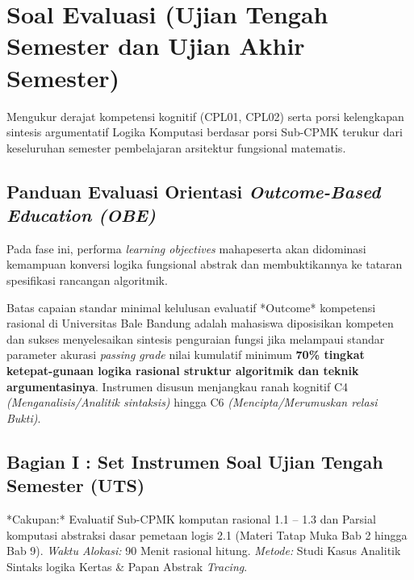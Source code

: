 \documentclass[../main.tex]{subfiles}
\begin{document}
\chapter{Soal Evaluasi (Ujian Tengah Semester dan Ujian Akhir Semester)}

\begin{subcpmk}
  \item Mengukur derajat kompetensi kognitif (CPL01, CPL02) serta porsi kelengkapan sintesis argumentatif Logika Komputasi berdasar porsi Sub-CPMK terukur dari keseluruhan semester pembelajaran arsitektur fungsional matematis.
\end{subcpmk}

\section{Panduan Evaluasi Orientasi \textit{Outcome-Based Education (OBE)} }
Pada fase ini, performa \textit{learning objectives} mahapeserta akan didominasi kemampuan konversi logika fungsional abstrak dan membuktikannya ke tataran spesifikasi rancangan algoritmik.

Batas capaian standar minimal kelulusan evaluatif *Outcome* kompetensi rasional di Universitas Bale Bandung adalah mahasiswa diposisikan kompeten dan sukses menyelesaikan sintesis penguraian fungsi jika melampaui standar parameter akurasi \textit{passing grade} nilai kumulatif minimum \textbf{70\% tingkat ketepat-gunaan logika rasional struktur algoritmik dan teknik argumentasinya}. Instrumen disusun menjangkau ranah kognitif C4 \textit{(Menganalisis/Analitik sintaksis)} hingga C6 \textit{(Mencipta/Merumuskan relasi Bukti)}.

\section{Bagian I : Set Instrumen Soal Ujian Tengah Semester (UTS)}
*Cakupan:* Evaluatif Sub-CPMK komputan rasional 1.1 -- 1.3 dan Parsial komputasi abstraksi dasar pemetaan logis 2.1 (Materi Tatap Muka Bab 2 hingga Bab 9).
\textit{Waktu Alokasi:} 90 Menit rasional hitung.
\textit{Metode:} Studi Kasus Analitik Sintaks logika Kertas \& Papan Abstrak \textit{Tracing}.
\end{document}
